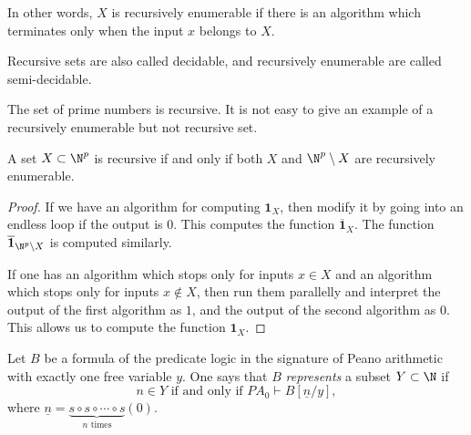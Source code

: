 \begin{page}

In other words, $X$ is recursively enumerable if there is an algorithm which terminates only when the input $x$ belongs to $X$.

Recursive sets are also called decidable, and recursively enumerable are called semi-decidable.


\end{page}

\begin{page}

\begin{exl}
The set of prime numbers is recursive.
It is not easy to give an example of a recursively enumerable but not recursive set.
\end{exl}

\end{page}

\begin{page}

\begin{lem}
A set $X \subset \N^p$ is recursive if and only if both $X$ and $\N^p \setminus X$ are recursively enumerable.
\end{lem}

\end{page}

\begin{page}

\begin{proof}
If we have an algorithm for computing $\mathbf{1}_X$, then modify it by going into an endless loop if the output is $0$.
This computes the function $\overline{\mathbf{1}}_X$. The function $\overline{\mathbf{1}}_{\N^p \setminus X}$ is computed similarly.

If one has an algorithm which stops only for inputs $x \in X$ and an algorithm which stops only for inputs $x \notin X$, then run them parallelly
and interpret the output of the first algorithm as $1$, and the output of the second algorithm as $0$.
This allows us to compute the function $\mathbf{1}_X$.
\end{proof}



\end{page}

\begin{page}

\begin{dfn}
Let $B$ be a formula of the predicate logic in the signature of Peano arithmetic with exactly one free variable $y$.
One says that $B$ \emph{represents} a subset $Y \subset \N$ if
\[
n \in Y \text{ if and only if }PA_0 \vdash B[\underline{n}/y],
\]
where $\underline{n} = \underbrace{s \circ s \circ \cdots \circ s}_{n\text{ times}}(0)$.
\end{dfn}

\end{page}

